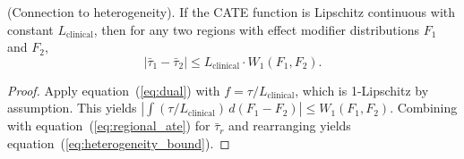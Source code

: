 \documentclass[AMA,Times1COL]{WileyNJDv5}
\begin{document}
\begin{proposition}\label{prop:heterogeneity}
\textup{(Connection to heterogeneity).} If the CATE function is Lipschitz continuous with constant $L_{\text{clinical}}$, then for any two regions with effect modifier distributions $F_1$ and $F_2$,
\begin{equation}
|\bar{\tau}_1 - \bar{\tau}_2| \leq L_{\text{clinical}} \cdot W_1(F_1, F_2).
\label{eq:heterogeneity_bound}
\end{equation}
\end{proposition}

\begin{proof}
Apply equation~(\ref{eq:dual}) with $f = \tau / L_{\text{clinical}}$, which is 1-Lipschitz by assumption. This yields $\left|\int (\tau / L_{\text{clinical}}) \, d(F_1 - F_2)\right| \leq W_1(F_1, F_2)$. Combining with equation~(\ref{eq:regional_ate}) for $\bar{\tau}_r$ and rearranging yields equation~(\ref{eq:heterogeneity_bound}).
\end{proof}
\end{document}
